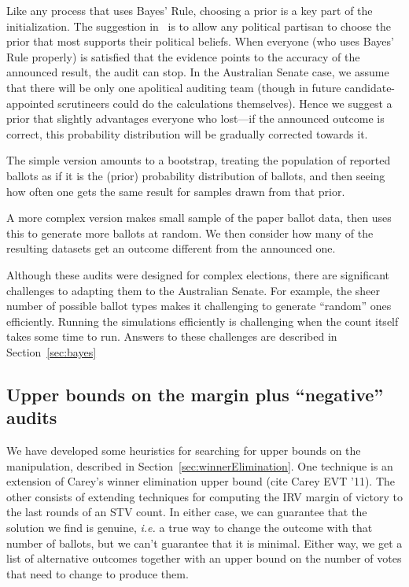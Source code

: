 \documentclass[10pt,a4paper]{article}
\begin{document}
Like any process that uses Bayes' Rule, choosing a prior is a key part of the initialization.  The suggestion in~\cite{rivest2012bayesian} is to allow any political partisan to choose the prior that most supports their political beliefs.  When everyone (who uses Bayes' Rule properly) is satisfied that the evidence points to the accuracy of the announced result, the audit can stop.  In the Australian Senate case, we assume that there will be only one apolitical auditing team (though in future candidate-appointed scrutineers could do the calculations themselves).  Hence we suggest a prior that slightly advantages everyone who lost---if the announced outcome is correct, this probability distribution will be gradually corrected towards it.

The simple version amounts to a bootstrap, treating the population of reported ballots as
if it is the (prior) probability distribution of ballots, and then seeing how often one gets the same result for samples drawn from that prior. 

A more complex version makes small sample of the paper ballot data, then uses this to generate more ballots at random.  We then consider how many of the resulting datasets get an outcome different from the announced one.  

Although these audits were designed for complex elections, there are significant challenges to adapting them to the Australian Senate.  For example, the sheer number of possible ballot types makes it challenging to generate ``random'' ones efficiently.  Running the simulations efficiently is challenging when the count itself takes some time to run.  Answers to these challenges are described in Section~\ref{sec:bayes}



\subsection{Upper bounds on the margin plus ``negative'' audits}
We have developed some heuristics for searching for upper bounds on the manipulation, described in Section~\ref{sec:winnerElimination}.  One technique is an extension of Carey's winner elimination upper bound (cite Carey EVT '11).  The other consists of extending techniques for computing the IRV margin of victory to the last rounds of an STV count.  In either case, we can guarantee that the solution we find is genuine, {\it i.e.} a true way to change the outcome with that number of ballots, but we can't guarantee that it is minimal.  Either way, we get a list of alternative outcomes together with an upper bound on the number of votes that need to change to produce them.
\end{document}
